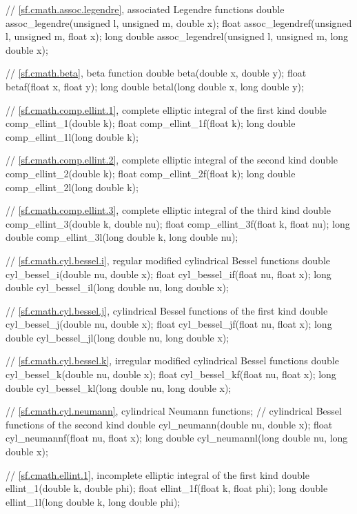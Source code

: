 \begin{codeblock}
{  // \ref{sf.cmath.assoc.legendre}, associated Legendre functions
  double       assoc_legendre(unsigned l, unsigned m, double x);
  float        assoc_legendref(unsigned l, unsigned m, float x);
  long double  assoc_legendrel(unsigned l, unsigned m, long double x);

  // \ref{sf.cmath.beta}, beta function
  double       beta(double x, double y);
  float        betaf(float x, float y);
  long double  betal(long double x, long double y);

  // \ref{sf.cmath.comp.ellint.1}, complete elliptic integral of the first kind
  double       comp_ellint_1(double k);
  float        comp_ellint_1f(float k);
  long double  comp_ellint_1l(long double k);

  // \ref{sf.cmath.comp.ellint.2}, complete elliptic integral of the second kind
  double       comp_ellint_2(double k);
  float        comp_ellint_2f(float k);
  long double  comp_ellint_2l(long double k);

  // \ref{sf.cmath.comp.ellint.3}, complete elliptic integral of the third kind
  double       comp_ellint_3(double k, double nu);
  float        comp_ellint_3f(float k, float nu);
  long double  comp_ellint_3l(long double k, long double nu);

  // \ref{sf.cmath.cyl.bessel.i}, regular modified cylindrical Bessel functions
  double       cyl_bessel_i(double nu, double x);
  float        cyl_bessel_if(float nu, float x);
  long double  cyl_bessel_il(long double nu, long double x);

  // \ref{sf.cmath.cyl.bessel.j}, cylindrical Bessel functions of the first kind
  double       cyl_bessel_j(double nu, double x);
  float        cyl_bessel_jf(float nu, float x);
  long double  cyl_bessel_jl(long double nu, long double x);

  // \ref{sf.cmath.cyl.bessel.k}, irregular modified cylindrical Bessel functions
  double       cyl_bessel_k(double nu, double x);
  float        cyl_bessel_kf(float nu, float x);
  long double  cyl_bessel_kl(long double nu, long double x);

  // \ref{sf.cmath.cyl.neumann}, cylindrical Neumann functions;
  // cylindrical Bessel functions of the second kind
  double       cyl_neumann(double nu, double x);
  float        cyl_neumannf(float nu, float x);
  long double  cyl_neumannl(long double nu, long double x);

  // \ref{sf.cmath.ellint.1}, incomplete elliptic integral of the first kind
  double       ellint_1(double k, double phi);
  float        ellint_1f(float k, float phi);
  long double  ellint_1l(long double k, long double phi);

}
\end{codeblock}
